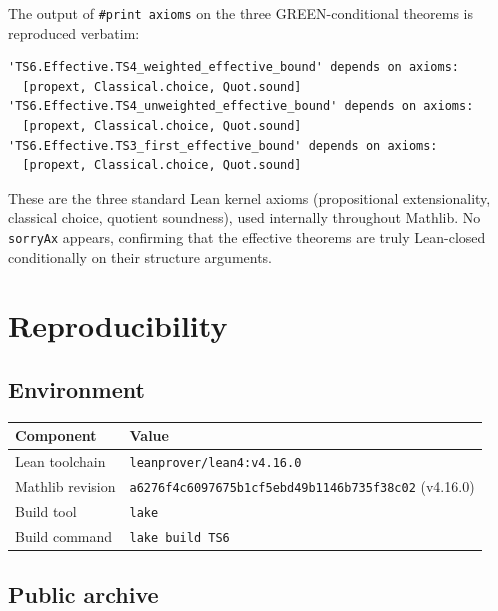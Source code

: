 \documentclass[11pt,a4paper]{article}
\theoremstyle{definition}
\begin{document}
The output of \verb|#print axioms| on the three GREEN-conditional theorems is reproduced verbatim:
\begin{lstlisting}
'TS6.Effective.TS4_weighted_effective_bound' depends on axioms:
  [propext, Classical.choice, Quot.sound]
'TS6.Effective.TS4_unweighted_effective_bound' depends on axioms:
  [propext, Classical.choice, Quot.sound]
'TS6.Effective.TS3_first_effective_bound' depends on axioms:
  [propext, Classical.choice, Quot.sound]
\end{lstlisting}

These are the three standard Lean kernel axioms (propositional extensionality, classical choice, quotient soundness), used internally throughout Mathlib. No \verb|sorryAx| appears, confirming that the effective theorems are truly Lean-closed conditionally on their structure arguments.

\section{Reproducibility}\label{sec:repro}

\subsection{Environment}

\begin{table}[h]
\centering
\renewcommand{\arraystretch}{1.2}
\begin{tabular}{@{}ll@{}}
\toprule
\textbf{Component} & \textbf{Value} \\
\midrule
Lean toolchain & \texttt{leanprover/lean4:v4.16.0} \\
Mathlib revision & \texttt{a6276f4c6097675b1cf5ebd49b1146b735f38c02} (v4.16.0) \\
Build tool & \texttt{lake} \\
Build command & \texttt{lake build TS6} \\
\bottomrule
\end{tabular}
\end{table}

\subsection{Public archive}
\end{document}
